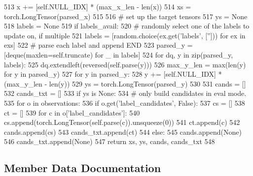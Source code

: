 \begin{DoxyCode}
513             x += [self.NULL\_IDX] * (max\_x\_len - len(x))
514         xs = torch.LongTensor(parsed\_x)
515 
516         \textcolor{comment}{# set up the target tensors}
517         ys = \textcolor{keywordtype}{None}
518         labels = \textcolor{keywordtype}{None}
519         \textcolor{keywordflow}{if} labels\_avail:
520             \textcolor{comment}{# randomly select one of the labels to update on, if multiple}
521             labels = [random.choice(ex.get(\textcolor{stringliteral}{'labels'}, [\textcolor{stringliteral}{''}])) \textcolor{keywordflow}{for} ex \textcolor{keywordflow}{in} exs]
522             \textcolor{comment}{# parse each label and append END}
523             parsed\_y = [deque(maxlen=self.truncate) \textcolor{keywordflow}{for} \_ \textcolor{keywordflow}{in} labels]
524             \textcolor{keywordflow}{for} dq, y \textcolor{keywordflow}{in} zip(parsed\_y, labels):
525                 dq.extendleft(reversed(self.parse(y)))
526             max\_y\_len = max(len(y) \textcolor{keywordflow}{for} y \textcolor{keywordflow}{in} parsed\_y)
527             \textcolor{keywordflow}{for} y \textcolor{keywordflow}{in} parsed\_y:
528                 y += [self.NULL\_IDX] * (max\_y\_len - len(y))
529             ys = torch.LongTensor(parsed\_y)
530 
531         cands = []
532         cands\_txt = []
533         \textcolor{keywordflow}{if} ys \textcolor{keywordflow}{is} \textcolor{keywordtype}{None}:
534             \textcolor{comment}{# only build candidates in eval mode.}
535             \textcolor{keywordflow}{for} o \textcolor{keywordflow}{in} observations:
536                 \textcolor{keywordflow}{if} o.get(\textcolor{stringliteral}{'label\_candidates'}, \textcolor{keyword}{False}):
537                     cs = []
538                     ct = []
539                     \textcolor{keywordflow}{for} c \textcolor{keywordflow}{in} o[\textcolor{stringliteral}{'label\_candidates'}]:
540                         cs.append(torch.LongTensor(self.parse(c)).unsqueeze(0))
541                         ct.append(c)
542                     cands.append(cs)
543                     cands\_txt.append(ct)
544                 \textcolor{keywordflow}{else}:
545                     cands.append(\textcolor{keywordtype}{None})
546                     cands\_txt.append(\textcolor{keywordtype}{None})
547         \textcolor{keywordflow}{return} xs, ys, cands, cands\_txt
548 
\end{DoxyCode}


\subsection{Member Data Documentation}
\mbox{\label{classparlai_1_1agents_1_1starspace_1_1starspace_1_1StarspaceAgent_a1986fb638717b81936ada2bf418b259f}} 
